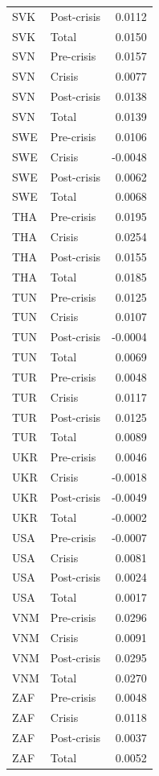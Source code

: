 \begin{longtable}[t]{llr}
SVK & Post-crisis & 0.0112\\
SVK & Total & 0.0150\\
SVN & Pre-crisis & 0.0157\\
\addlinespace
SVN & Crisis & 0.0077\\
SVN & Post-crisis & 0.0138\\
SVN & Total & 0.0139\\
SWE & Pre-crisis & 0.0106\\
SWE & Crisis & -0.0048\\
\addlinespace
SWE & Post-crisis & 0.0062\\
SWE & Total & 0.0068\\
THA & Pre-crisis & 0.0195\\
THA & Crisis & 0.0254\\
THA & Post-crisis & 0.0155\\
\addlinespace
THA & Total & 0.0185\\
TUN & Pre-crisis & 0.0125\\
TUN & Crisis & 0.0107\\
TUN & Post-crisis & -0.0004\\
TUN & Total & 0.0069\\
\addlinespace
TUR & Pre-crisis & 0.0048\\
TUR & Crisis & 0.0117\\
TUR & Post-crisis & 0.0125\\
TUR & Total & 0.0089\\
UKR & Pre-crisis & 0.0046\\
\addlinespace
UKR & Crisis & -0.0018\\
UKR & Post-crisis & -0.0049\\
UKR & Total & -0.0002\\
USA & Pre-crisis & -0.0007\\
USA & Crisis & 0.0081\\
\addlinespace
USA & Post-crisis & 0.0024\\
USA & Total & 0.0017\\
VNM & Pre-crisis & 0.0296\\
VNM & Crisis & 0.0091\\
VNM & Post-crisis & 0.0295\\
\addlinespace
VNM & Total & 0.0270\\
ZAF & Pre-crisis & 0.0048\\
ZAF & Crisis & 0.0118\\
ZAF & Post-crisis & 0.0037\\
ZAF & Total & 0.0052\\
\bottomrule
\end{longtable}
